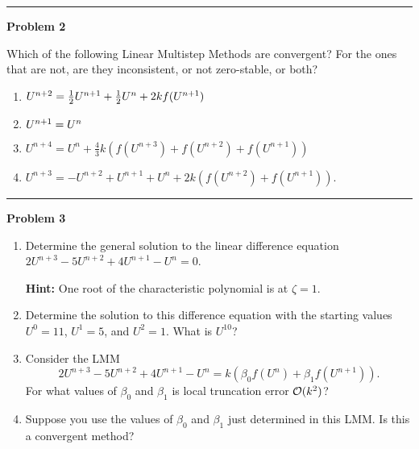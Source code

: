 \documentclass[10pt]{article}
\begin{document}


\vskip 1cm
\hrule
{\bf Problem 2}

Which of the following Linear Multistep Methods are convergent?  For 
the ones that are not, are they inconsistent, or not zero-stable, or both?
 \begin{enumerate}
 \item $U^{n+2} = \frac{1}{2} U^{n+1} + \frac{1}{2} U^{n} + 2kf(U^{n+1})$
 \item $U^{n+1} = U^n$ 
 \item $U^{n+4} = U^{n} + \frac 4 3 k(f(U^{n+3})+f(U^{n+2})+f(U^{n+1}))$
 \item $U^{n+3} = -U^{n+2} + U^{n+1} +U^{n}+2k(f(U^{n+2})+f(U^{n+1}))$.
 \end{enumerate}






\vskip 1cm
\hrule
{\bf Problem 3}

\begin{enumerate}
\item Determine the general solution to the linear difference equation
$2U^{n+3} - 5U^{n+2} + 4U^{n+1} - U^n = 0$.

{\bf Hint:} One root of the characteristic polynomial is at $\zeta=1$.

\item Determine the solution to this difference equation with the starting
values $U^0=11$, $U^1=5$, and $U^2=1$.  What is $U^{10}$?

\item Consider the LMM
\[
2U^{n+3} - 5U^{n+2} + 4U^{n+1} - U^n = k(\beta_0 f(U^n) + \beta_1 f(U^{n+1})).
\]
For what values of $\beta_0$ and $\beta_1$ is local truncation error
${\mathcal O}(k^2)$?

\item Suppose you use the values of $\beta_0$ and $\beta_1$ just determined
in this LMM.  Is this a convergent method?

\end{enumerate} 

\end{document}
